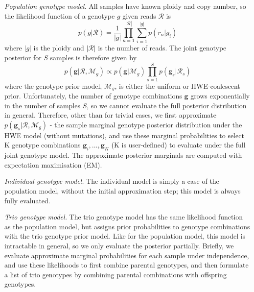 \documentclass[notitlepage, twocolumn, 10pt]{article}
\begin{document}
\vspace{3mm}
\noindent\emph{Population genotype model.} All samples have known ploidy and copy number, so the likelihood function of a genotype $g$ given reads $\mathcal{R}$ is
\begin{equation*}
	p(g | \mathcal{R}) = \frac{1}{|g|} \prod_{n=1}^{|\mathcal{R}|} \sum_{i = 1}^{|g|} p(r_n | g_{i})
\end{equation*}
where $|g|$ is the ploidy and $|\mathcal{R}|$ is the number of reads. The joint genotype posterior for $S$ samples is therefore given by
\begin{equation*}
	p(\boldsymbol{g} | \boldsymbol{\mathcal{R}}, \mathcal{M}_g) \propto p(\boldsymbol{g} | \mathcal{M}_g) \prod_{s=1}^S p(\boldsymbol{g}_s | \boldsymbol{\mathcal{R}}_s)
\end{equation*}
where the genotype prior model, $\mathcal{M}_g$, is either the uniform or HWE-coalescent prior. Unfortunately, the number of genotype combinations $\boldsymbol{g}$ grows exponentially in the number of samples $S$, so we cannot evaluate the full posterior distribution in general. Therefore, other than for trivial cases, we first approximate $p(\boldsymbol{g}_s | \boldsymbol{\mathcal{R}}, \mathcal{M}_g)$ - the sample marginal genotype posterior distribution under the HWE model (without mutations), and use these marginal probabilities to select K genotype combinations $\boldsymbol{g}_i, \dots, \boldsymbol{g}_K$ (K is user-defined) to evaluate under the full joint genotype model. The approximate posterior marginals are computed with expectation maximisation (EM).

\vspace{3mm}
\noindent\emph{Individual genotype model.} The individual model is simply a case of the population model, without the initial approximation step; this model is always fully evaluated.

\vspace{3mm}
\noindent\emph{Trio genotype model.} The trio genotype model has the same likelihood function as the population model, but assigns prior probabilities to genotype combinations with the trio genotype prior model. Like for the population model, this model is intractable in general, so we only evaluate the posterior partially. Briefly, we evaluate approximate marginal probabilities for each sample under independence, and use these likelihoods to first combine parental genotypes, and then formulate a list of trio genotypes by combining parental combinations with offspring genotypes.
\end{document}
